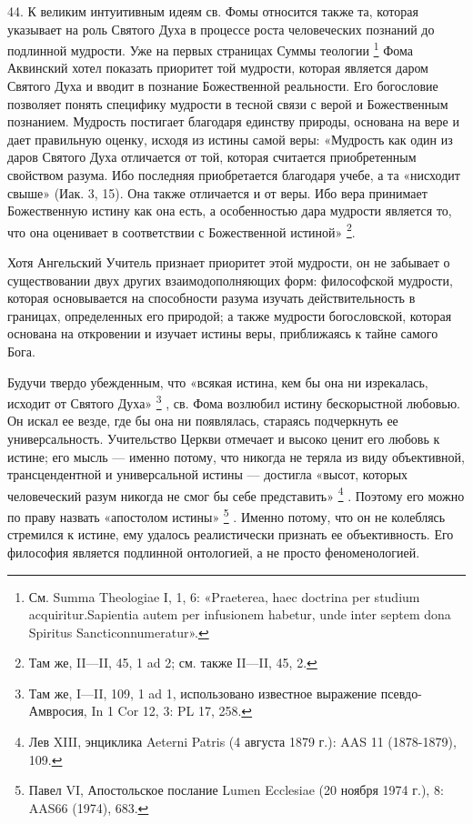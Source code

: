 \documentclass[a5paper,10pt]{article}
\begin{document}
44. К великим интуитивным идеям св. Фомы относится также та, которая указывает
на роль Святого Духа в процессе роста человеческих познаний до подлинной
мудрости. Уже на первых страницах Суммы теологии \footnote{См. Summa Theologiae
I, 1, 6: «Praeterea, haec doctrina per studium acquiritur.Sapientia autem per
infusionem habetur, unde inter septem dona Spiritus Sancticonnumeratur».}  Фома
Аквинский хотел показать приоритет той мудрости, которая является даром Святого
Духа и вводит в познание Божественной реальности. Его богословие позволяет
понять специфику мудрости в тесной связи с верой и Божественным познанием.
Мудрость постигает благодаря единству природы, основана на вере и дает
правильную оценку, исходя из истины самой веры: «Мудрость как один из даров
Святого Духа отличается от той, которая считается приобретенным свойством
разума. Ибо последняя приобретается благодаря учебе, а та «нисходит свыше»
(Иак. 3, 15). Она также отличается и от веры. Ибо вера принимает Божественную
истину как она есть, а особенностью дара мудрости является то, что она
оценивает в соответствии с Божественной истиной» \footnote{Там же, II—II, 45, 1
ad 2; см. также II—II, 45, 2.}.

Хотя Ангельский Учитель признает приоритет этой мудрости, он не забывает о
существовании двух других взаимодополняющих форм: философской мудрости, которая
основывается на способности разума изучать действительность в границах,
определенных его природой; а также мудрости богословской, которая основана на
откровении и изучает истины веры, приближаясь к тайне самого Бога.

Будучи твердо убежденным, что «всякая истина, кем бы она ни изрекалась, исходит
от Святого Духа» \footnote{Там же, I—II, 109, 1 ad 1, использовано известное
выражение псевдо-Амвросия, In 1 Cor 12, 3: PL 17, 258.}  , св. Фома возлюбил
истину бескорыстной любовью. Он искал ее везде, где бы она ни появлялась,
стараясь подчеркнуть ее универсальность.  Учительство Церкви отмечает и высоко
ценит его любовь к истине; его мысль — именно потому, что никогда не теряла из
виду объективной, трансцендентной и универсальной истины — достигла «высот,
которых человеческий разум никогда не смог бы себе представить» \footnote{Лев
XIII, энциклика Aeterni Patris (4 августа 1879 г.): AAS 11 (1878-1879), 109.} .
Поэтому его можно по праву назвать «апостолом истины» \footnote{Павел VI,
Апостольское послание Lumen Ecclesiae (20 ноября 1974 г.), 8: AAS66 (1974),
683.}  . Именно потому, что он не колеблясь стремился к истине, ему удалось
реалистически признать ее объективность. Его философия является подлинной
онтологией, а не просто феноменологией.
\end{document}
